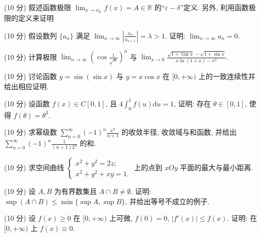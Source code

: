 \par{}
(10 分) 叙述函数极限 $\lim_{x \to x_0^-} f(x) = A \in \mathbb{R}$ 的“$\varepsilon - \delta$”定义. 另外, 利用函数极限的定义来证明\par
\nopagebreak[4]
(10 分) 假设数列 $\{a_{n}\}$ 满足 $\lim_{n\to \infty}\left|\frac{a_n}{a_{n + 1}}\right| = \lambda > 1$. 证明: $\lim_{n\to \infty}a_n = 0$.\par
(10 分) 计算极限 $\lim_{n\to \infty}\left(\cos \frac{1}{\sqrt{n}}\right)^n$ 与 $\lim_{x\to 0}\frac{\sqrt{1 + \tan x} - \sqrt{1 + \sin x}}{x\ln(1 + x) - x^2}.$\par
(10 分) 讨论函数 $y = \sin (\sin x)$ 与 $y = x\cos x$ 在 $[0, +\infty)$ 上的一致连续性并给出相应证明.\par
(10 分) 设函数 $f(x) \in C[0,1]$, 且 $4\int_{0}^{1} f(u) \mathrm{d}u = 1$, 证明: 存在 $\theta \in [0,1]$, 使得 $f(\theta) = \theta^3$.\par
(10 分) 求幂级数 $\sum_{n=0}^{\infty} (-1)^n \frac{x^n}{n+1}$ 的收敛半径, 收敛域与和函数, 并给出 $\sum_{n=0}^{\infty} (-1)^n \frac{1}{(n+1)2^n}$ 的和.\par
(10 分) 求空间曲线 $\left\{ \begin{array}{l} x^{2} + y^{2} = 2z; \\ x^{2} + y^{2} + xy = 1. \end{array} \right.$ 上的点到 $xOy$ 平面的最大与最小距离.\par
(10 分) 设 $A, B$ 为有界数集且 $A \cap B \neq \emptyset$. 证明: $\sup(A \cap B) \leq \min\{\sup A, \sup B\}$, 并给出等号不成立的例子.\par
(10 分) 设 $f(x) \geq 0$ 在 $[0, +\infty)$ 上可微, $f(0) = 0$, $|f'(x)| \leq f(x)$. 证明: 在 $[0, +\infty)$ 上 $f(x) \equiv 0$.\par
